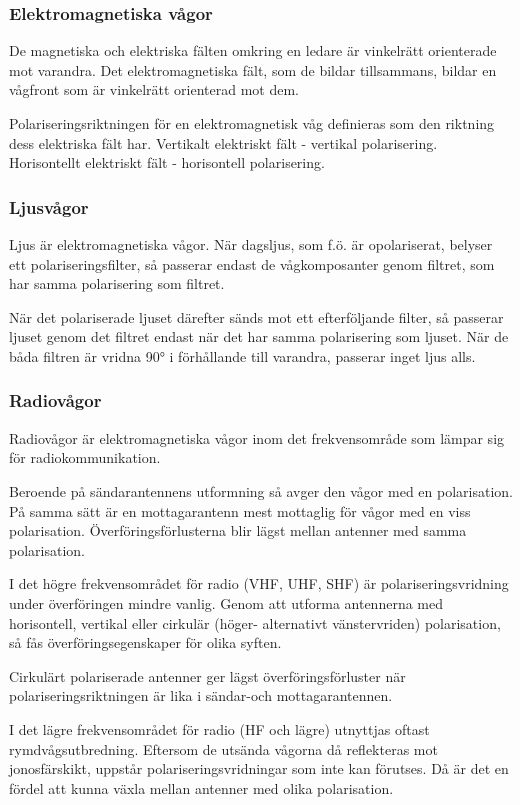 \subsubsection{Elektromagnetiska vågor}

De magnetiska och elektriska fälten omkring en ledare är vinkelrätt orienterade
mot varandra. Det elektromagnetiska fält, som de bildar tillsammans, bildar en
vågfront som är vinkelrätt orienterad mot dem.

Polariseringsriktningen för en elektromagnetisk våg definieras som den riktning
dess elektriska fält har.
Vertikalt elektriskt fält - vertikal polarisering.
Horisontellt elektriskt fält - horisontell polarisering.

\subsubsection{Ljusvågor}

Ljus är elektromagnetiska vågor. När dagsljus, som f.ö. är opolariserat,
belyser ett polariseringsfilter, så passerar endast de vågkomposanter genom
filtret, som har samma polarisering som filtret.

När det polariserade ljuset därefter sänds mot ett efterföljande filter, så
passerar ljuset genom det filtret endast när det har samma polarisering som
ljuset. När de båda filtren är vridna 90° i förhållande till varandra,
passerar inget ljus alls.

\subsubsection{Radiovågor}
Radiovågor är elektromagnetiska vågor inom det frekvensområde som lämpar sig
för radiokommunikation.

Beroende på sändarantennens utformning så avger den vågor med en polarisation.
På samma sätt är en mottagarantenn mest mottaglig för vågor med en viss
polarisation. Överföringsförlusterna blir lägst mellan antenner med samma
polarisation.

I det högre frekvensområdet för radio (VHF, UHF, SHF) är polariseringsvridning
under överföringen mindre vanlig. Genom att utforma antennerna med horisontell,
vertikal eller cirkulär (höger- alternativt vänstervriden) polarisation, så fås
överföringsegenskaper för olika syften.

Cirkulärt polariserade antenner ger lägst överföringsförluster när
polariseringsriktningen är lika i sändar-och mottagarantennen.

I det lägre frekvensområdet för radio (HF och lägre) utnyttjas oftast
rymdvågsutbredning. Eftersom de utsända vågorna då reflekteras mot
jonosfärskikt, uppstår polariseringsvridningar som inte kan förutses. Då är det
en fördel att kunna växla mellan antenner med olika polarisation.

